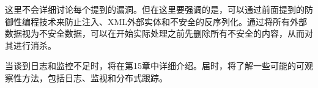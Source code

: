 这里不会详细讨论每个提到的漏洞。但在这里要强调的是，可以通过前面提到的防御性编程技术来防止注入、XML外部实体和不安全的反序列化。通过将所有外部数据视为不安全数据，可以在开始实际处理之前先删除所有不安全的内容，从而对其进行消杀。

当谈到日志和监控不足时，将在第15章中详细介绍。届时，将了解一些可能的可观察性方法，包括日志、监视和分布式跟踪。


















